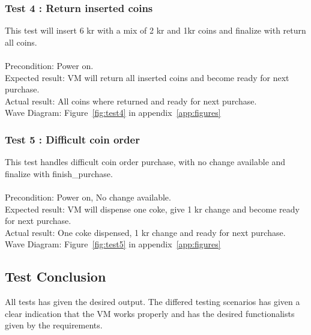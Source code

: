 \subsubsection*{Test 4 : Return inserted coins}
This test will insert 6 kr with a mix of 2 kr and 1kr coins and finalize with return all coins.\\
 \\
Precondition:  Power on.\\
Expected result: VM will return all inserted coins and become ready for next purchase.\\
Actual result: All coins where returned and ready for next purchase.\\
Wave Diagram: Figure~\ref{fig:test4} in appendix~\ref{app:figures}

\subsubsection*{Test 5 : Difficult coin order }
This test handles difficult coin order purchase, with no change available and finalize with finish\_purchase.\\\
 \\
Precondition:  Power on, No change available.\\
Expected result: VM will dispense one coke, give 1 kr change and become ready for next purchase.\\
Actual result: One coke dispensed, 1 kr change and ready for next purchase.\\
Wave Diagram: Figure~\ref{fig:test5} in appendix~\ref{app:figures}

\subsection{Test Conclusion}
All tests has given the desired output. The differed testing scenarios has given a clear indication that the VM works properly and has the desired functionalists given by the requirements.
